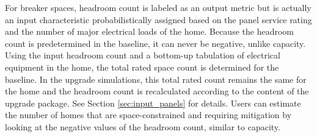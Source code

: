 For breaker spaces, headroom count is labeled as an output metric but is actually an input characteristic probabilistically assigned based on the panel service rating and the number of major electrical loads of the home. Because the headroom count is predetermined in the baseline, it can never be negative, unlike capacity. Using the input headroom count and a bottom-up tabulation of electrical equipment in the home, the total rated space count is determined for the baseline. In the upgrade simulations, this total rated count remains the same for the home and the headroom count is recalculated according to the content of the upgrade package. See Section \ref{sec:input_panels} for details. Users can estimate the number of homes that are space-constrained and requiring mitigation by looking at the negative values of the headroom count, similar to capacity. 
